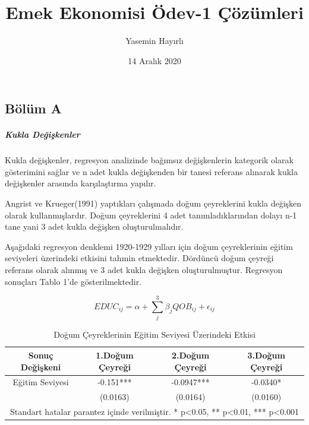 \documentclass[12pt, a4paper, showtrims]{article}
\begin{document}
    \title{Emek Ekonomisi Ödev-1 Çözümleri}
    \author{Yasemin Hayırlı}
    \date{14 Aralık 2020}
    \maketitle

    \subsection*{Bölüm A}
    \setlength{\parindent}{0em}
    \setlength{\parskip}{0.3em}

        \subparagraph{Kukla Değişkenler} 
        \begin{justify}
        \setlength{\parindent}{0em}

Kukla değişkenler, regresyon analizinde bağımsız değişkenlerin
kategorik olarak gösterimini sağlar ve n adet kukla değişkenden bir tanesi 
referans alınarak kukla değişkenler arasında karşılaştırma yapılır. \par

Angrist ve Krueger(1991) yaptıkları çalışmada doğum çeyreklerini kukla 
değişken olarak kullanmışlardır. Doğum çeyreklerini 4 adet tanımladıklarından 
dolayı n-1 tane yani 3 adet kukla değişken oluşturulmalıdır. \par

Aşağıdaki regresyon denklemi 1920-1929 yılları için doğum çeyreklerinin 
eğitim seviyeleri üzerindeki etkisini tahmin etmektedir. Dördüncü doğum çeyreği 
referans olarak alınmış ve 3 adet kukla değişken oluşturulmuştur. 
Regresyon sonuçları Tablo 1'de gösterilmektedir.

\[ EDUC_{ij} = \alpha + \sum_{j}^{3}\beta_jQOB_{ij} + \epsilon_{ij}  \]

\begin{table}[h!]
    \centering
    \caption{Doğum Çeyreklerinin Eğitim Seviyesi Üzerindeki Etkisi}
    \begin{tabular}{||c c c c||}    
    \hline
    Sonuç Değişkeni & 1.Doğum Çeyreği & 2.Doğum Çeyreği & 3.Doğum Çeyreği \\ [0.5ex] 
    \hline\hline
    Eğitim Seviyesi & -0.151***       & -0.0947***      &  -0.0340* \\ 
                    & (0.0163)        & (0.0164)        & (0.0160)  \\
    \hline
    \multicolumn{4}{|c|}{Standart hatalar parantez içinde verilmiştir. * p<0.05, ** p<0.01, *** p<0.001} \\
    \hline
    \hline
    \end{tabular}
    

\end{table}
\end{justify}
\end{document}
